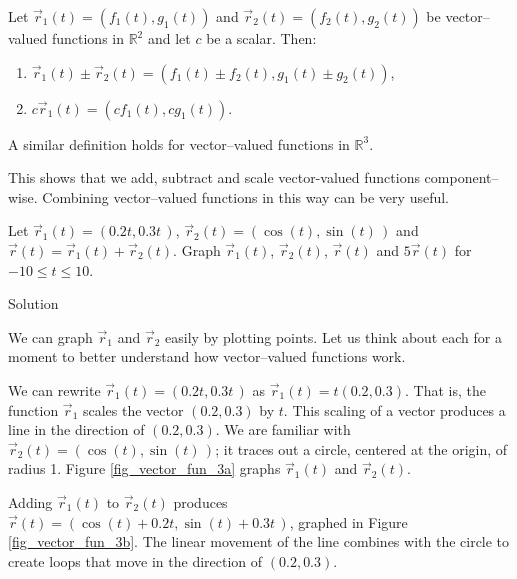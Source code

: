 \ifcalculus
Let $\vec r_1(t)=\left( f_1(t),g_1(t)\right)$ and $\vec r_2(t)=\left( f_2(t),g_2(t)\right)$ be vector--valued functions in $\mathbb{R}^2$ and let $c$ be a scalar. Then:
\begin{enumerate}[align=left]
	\item $\vec r_1(t) \pm \vec r_2(t) = \left( f_1(t)\pm f_2(t),g_1(t)\pm g_2(t)\right)$,
	\item	$c\vec r_1(t) = \left( cf_1(t),cg_1(t)\right)$.
\end{enumerate}
A similar definition holds for vector--valued functions in $\mathbb{R}^3$.
\fi

This shows that we add, subtract and scale vector-valued functions component--wise. Combining vector--valued functions in this way can be very useful.

\begin{example}\label{ex_vvf3}
Let $\vec r_1(t) = \left(0.2t,0.3t\,\right)$, $\vec r_2(t) = \left(\cos (t),\sin (t)\,\right)$ and $\vec r(t) = \vec r_1(t)+\vec r_2(t)$. Graph $\vec r_1(t)$, $\vec r_2(t)$, $\vec r(t)$ and $5\vec r(t)$ for $-10\leq t\leq10$.

Solution 

We can graph $\vec r_1$ and $\vec r_2$ easily by plotting points. Let us think about each for a moment to better understand how vector--valued functions work.

We can rewrite $\vec r_1(t) = \left( 0.2t,0.3t\,\right)$ as $ \vec r_1(t) = t\left( 0.2,0.3\right)$. That is, the function $\vec r_1$ scales the vector $\left( 0.2,0.3\right)$ by $t$. This scaling of a vector produces a line in the direction of $\left( 0.2,0.3\right)$. We are familiar with $\vec r_2(t) = \left( \cos (t),\sin (t)\,\right)$; it traces out a circle, centered at the origin, of radius 1. Figure \ref{fig_vector_fun_3a} graphs $\vec r_1(t)$ and $\vec r_2(t)$.

Adding $\vec r_1(t)$ to $\vec r_2(t)$ produces $\vec r(t) = \left(\cos (t) + 0.2t,\sin (t)+0.3t\,\right)$, graphed in Figure \ref{fig_vector_fun_3b}. The linear movement of the line combines with the circle to create loops that move in the direction of $\left( 0.2,0.3\right)$.  




\end{example}
